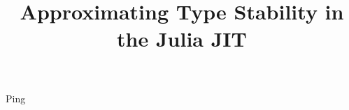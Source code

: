 \documentclass[sigplan,review]{acmart}
\begin{document}
\title{Approximating Type Stability in the Julia JIT}


\maketitle


Ping
\end{document}
